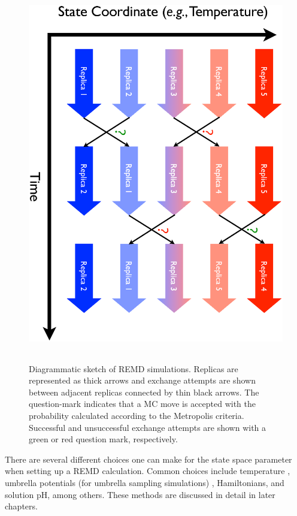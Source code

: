 \begin{figure}
   \includegraphics[height=6.5in, angle=90]
                   {REMD.ps}
   \caption[Diagrammatic sketch of REMD simulations. Replicas are represented as
            thick arrows and exchange attempts are shown between adjacent
            replicas]
           {Diagrammatic sketch of REMD simulations. Replicas are represented as
            thick arrows and exchange attempts are shown between adjacent
            replicas connected by thin black arrows. The question-mark indicates
            that a MC move is accepted with the probability calculated according
            to the Metropolis criteria. Successful and unsuccessful exchange
            attempts are shown with a green or red question mark, respectively.}
   \label{fig2:REMD}
\end{figure}

There are several different choices one can make for the state space parameter
when setting up a REMD calculation. Common choices include temperature
\cite{Sugita_ChemPhysLett_1999_v314_p141}, umbrella potentials (for umbrella
sampling simulations) \cite{Babin_JChemPhys_2008_v128_p134101,
Sugita_JChemPhys_2000_v113_p6042}, Hamiltonians,
\cite{Fukunishi_JChemPhys_2002_v116_p9058, Fajer_JComputChem_2009_v30_p1719,
Arrar_JChemTheoryComput_2013_v9_p18, Jiang_JChemTheoryComput_2010_v6_p2559,
Meng_JChemTheoryComput_2011_v7_p2721} and solution pH,
\cite{Wallace_JChemTheoryComput_2011_v7_p2617, Itoh_Proteins_2011_v79_p3420,
Swails_JChemTheoryComput_2012_v8_p4393, Dashti_JPhysChemB_2012_v116_p8805}
among others. \cite{Wu_JChemPhys_2012_v137_p044106,
Bolhuis_JChemPhys_2008_v129_p114108} These methods are discussed in detail in
later chapters.

